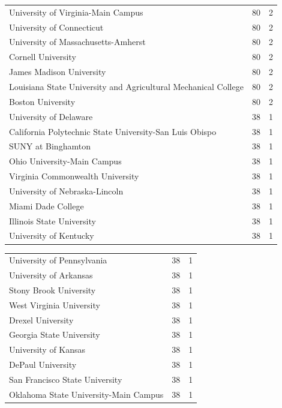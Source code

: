 \documentclass{mcmthesis}
\begin{document}
\begin{appendices}
\begin{tabular}{lcc}
        University of Virginia-Main Campus	&80	&2\\
        University of Connecticut	&80	&2\\
        University of Massachusetts-Amherst	&80&	2\\
        Cornell University	&80	&2\\
        James Madison University	&80&	2\\
        Louisiana State University and Agricultural Mechanical College&	80	&2\\
        Boston University	&80	&2\\
        University of Delaware	&38	&1\\
        California Polytechnic State University-San Luis Obispo	&38	&1\\
        SUNY at Binghamton	&38&	1\\
        Ohio University-Main Campus&	38	&1\\
        Virginia Commonwealth University	&38	&1\\
        University of Nebraska-Lincoln	&38	&1\\
        Miami Dade College	&38	&1\\
        Illinois State University	&38	&1\\
        University of Kentucky	&38	&1\\\hline
    \end{tabular}
    
    \newpage
    \begin{tabular}{lcc}\hline
        University of Pennsylvania&	38	&1\\
        University of Arkansas	&38	&1\\
        Stony Brook University&	38	&1\\
        West Virginia University	&38&	1\\
        
        Drexel University	&38&	1\\
        Georgia State University	&38&	1\\
        University of Kansas&	38	&1\\
        DePaul University	&38&	1\\
        San Francisco State University&	38&	1\\
        Oklahoma State University-Main Campus	&38&	1\\
        

\end{tabular}
\end{appendices}
\end{document}

